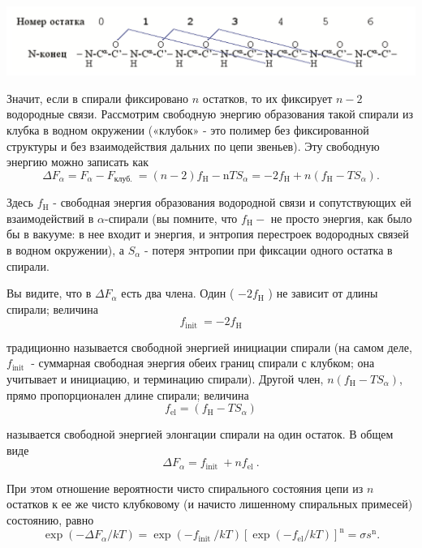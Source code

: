 \documentclass[
11pt,%
tightenlines,%
twoside,%
onecolumn,%
nofloats,%
nobibnotes,%
nofootinbib,%
superscriptaddress,%
noshowpacs,%
centertags]%
{revtex4}
\begin{document}
\includegraphics[width=\textwidth]{ostatok}

Значит, если в спирали фиксировано $n$ остатков, то их фиксирует $n-2$ водородные связи. Рассмотрим свободную энергию образования такой спирали из клубка в водном окружении («клубок» - это полимер без фиксированной структуры и без взаимодействия дальних по цепи звеньев). Эту свободную энергию можно записать как
\begin{equation}
	\Delta F_\alpha=F_\alpha-F_{\text {клуб. }}=(n-2) f_{\mathrm{H}}-\mathrm{n} T S_\alpha=-2 f_{\mathrm{H}}+n\left(f_{\mathrm{H}}-T S_\alpha\right) .
\end{equation}

Здесь $f_{\mathrm{H}}$ - свободная энергия образования водородной связи и сопутствующих ей взаимодействий в $\alpha$-спирали (вы помните, что $f_{\mathrm{H}}-$ не просто энергия, как было бы в вакууме: в нее входит и энергия, и энтропия перестроек водородных связей в водном окружении), а $S_\alpha$ - потеря энтропии при фиксации одного остатка в спирали.

Вы видите, что в $\Delta F_\alpha$ есть два члена. Один ( $-2 f_{\mathrm{H}}$ ) не зависит от длины спирали; величина
\begin{equation}
	f_{\text {init }}=-2 f_{\mathrm{H}}
\end{equation}

традиционно называется свободной энергией инициации спирали (на самом деле, $f_{\text {init }}$ - суммарная свободная энергия обеих границ спирали с клубком; она учитывает и инициацию, и терминацию спирали). Другой член, $n\left(f_{\mathrm{H}}-T S_\alpha\right)$, прямо пропорционален длине спирали; величина
\begin{equation}
	f_{\mathrm{el}}=\left(f_{\mathrm{H}}-T S_\alpha\right)
\end{equation}

называется свободной энергией элонгации спирали на один остаток. В общем виде
\begin{equation}
	\Delta F_\alpha=f_{\text {init }}+n f_{\text {el }} .
\end{equation}

При этом отношение вероятности чисто спирального состояния цепи из $n$ остатков к ее же чисто клубковому (и начисто лишенному спиральных примесей) состоянию, равно
\begin{equation}
	\exp \left(-\Delta F_\alpha / k T\right)=\exp \left(-f_{\text {init }} / k T\right)\left[\exp \left(-f_{\mathrm{el}} / k T\right)\right]^{\mathrm{n}}=\sigma s^{\mathrm{n}} .
\end{equation}
\end{document}
